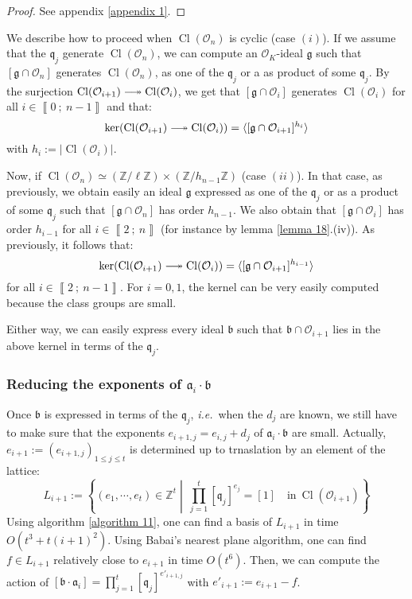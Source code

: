 \documentclass[a4paper,10pt]{report}
\theoremstyle{definition}
\theoremstyle{plain}
\theoremstyle{definition}
\newcommand{\ie}{\emph{i.e.}\ }
\newcommand{\Z}{\mathbb{Z}}
\newcommand{\mO}{\mathcal{O}}
\renewcommand{\i}[2]{\left\llbracket #1~;~#2\right\rrbracket}
\renewcommand{\(}{\left(}
\renewcommand{\)}{\right)}
\newcommand{\mf}[1]{\mathfrak{#1}}
\DeclareMathOperator{\Cl}{Cl}
\begin{document}
\begin{proof}
See appendix \ref{appendix 1}.
\end{proof}

We describe how to proceed when $\Cl(\mO_n)$ is cyclic (case $(i)$). If we assume that the $\mf{q}_j$ generate $\Cl(\mO_n)$, we can compute an $\mO_K$-ideal $\mf{g}$ such that $[\mf{g}\cap\mO_n]$ generates $\Cl(\mO_n)$, as one of the $\mf{q}_j$ or a as product of some $\mf{q}_j$. By the surjection $\Cl(\mO_{i+1})\relbar\joinrel\twoheadrightarrow\Cl(\mO_i)$, we get that $[\mf{g}\cap\mO_i]$ generates $\Cl(\mO_i)$ for all $i\in\i{0}{n-1}$ and that:
\[\ker(\Cl(\mO_{i+1})\relbar\joinrel\twoheadrightarrow\Cl(\mO_{i}))=\langle [\mf{g}\cap\mO_{i+1}]^{h_i}\rangle\]
with $h_i:=|\Cl(\mO_i)|$. 

Now, if $\Cl(\mO_n)\simeq(\Z/\ell\Z)\times(\Z/h_{n-1}\Z)$ (case $(ii)$).  In that case, as previously, we obtain easily an ideal $\mf{g}$ expressed as one of the $\mf{q}_j$ or as a product of some $\mf{q}_j$ such that $[\mf{g}\cap\mO_n]$ has order $h_{n-1}$. We also obtain that $[\mf{g}\cap\mO_i]$ has order $h_{i-1}$ for all $i\in\i{2}{n}$ (for instance by lemma \ref{lemma 18}.(iv)).  As previously, it follows that:
\[\ker(\Cl(\mO_{i+1})\relbar\joinrel\twoheadrightarrow\Cl(\mO_{i}))=\langle [\mf{g}\cap\mO_{i+1}]^{h_{i-1}}\rangle\]
for all $i\in\i{2}{n-1}$. For $i=0,1$, the kernel can be very easily computed because the class groups are small. 

Either way, we can easily express every ideal $\mf{b}$ such that $\mf{b}\cap\mO_{i+1}$ lies in the above kernel in terms of the $\mf{q}_j$.

\subsubsection{Reducing the exponents of $\mf{a}_i\cdot \mf{b}$}

Once $\mf{b}$ is expressed in terms of the $\mf{q}_j$, \ie when the $d_j$ are known, we still have to make sure that the exponents $e_{i+1,j}=e_{i,j}+d_j$ of $\mf{a}_i\cdot \mf{b}$ are small.  Actually, $e_{i+1}:=(e_{i+1,j})_{1\leq j\leq t}$ is determined up to trnaslation by an element of the lattice:
\[L_{i+1}:=\left\{(e_1,\cdots,e_{t})\in\Z^{t} \middle| \  \prod_{j=1}^t[\mf{q}_j]^{e_j}=[1] \quad \mbox{in} \ \Cl(\mO_{i+1}) \right\}\]
Using algorithm \ref{algorithm 11},  one can find a basis of $L_{i+1}$ in time $O(t^3+t(i+1)^2)$. Using Babai's nearest plane algorithm, one can find $f\in L_{i+1}$ relatively close to $e_{i+1}$ in time $O(t^6)$. Then, we can compute the action of $[\mf{b}\cdot\mf{a}_i]=\prod_{j=1}^t[\mf{q}_j]^{e'_{i+1,j}}$ with $e'_{i+1}:=e_{i+1}-f$.  
\end{document}
